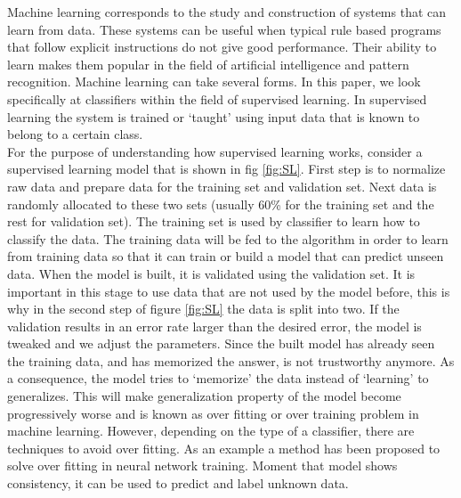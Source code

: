 Machine learning corresponds to the study and construction of systems that can learn from data. These systems can be useful when typical rule based programs that follow explicit instructions do not give good performance. Their ability to learn makes them popular in the field of artificial intelligence and pattern recognition. Machine learning can take several forms. In this paper, we look specifically at classifiers within the field of supervised learning. In supervised learning the system is trained or `taught' using input data that is known to belong to a certain class.\\ 

For the purpose of understanding how supervised learning works, consider a supervised learning model that is shown in fig \ref{fig:SL}. First step is to normalize raw data and prepare data for the training set and validation set. Next data is randomly allocated to these two sets (usually $60$\% for the training set and the rest for validation set). The training set is used by classifier to learn how to classify the data. The training data will be fed to the algorithm in order to learn from training data so that it can train or build a model that can predict unseen data. When the model is built, it is validated using the validation set. It is important in this stage to use data that are not used by the model before, this is why in the second step of figure \ref{fig:SL} the data is split into two. If the validation results in an error rate larger than the desired error, the model is tweaked and we adjust the parameters. Since the built model has already seen the training data, and has memorized the answer, is not trustworthy anymore. As a consequence, the model tries to `memorize' the data instead of `learning' to generalizes. This will make generalization property of the model become progressively worse and is known as over fitting or over training \cite{hawkins2004problem} problem in machine learning. However, depending on the type of a classifier, there are techniques to avoid over fitting. As an example a method \cite{Piotrowski201397} has been proposed to solve over fitting in neural network training. Moment that  model shows consistency, it can be used to predict and label unknown data. \\  
 
